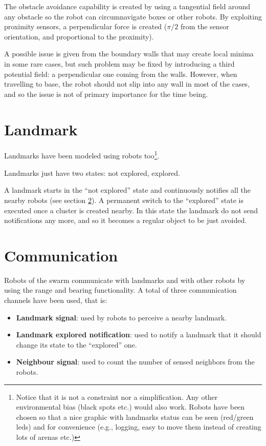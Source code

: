 \smallskip
The obstacle avoidance capability is created by using a tangential field around any obstacle so the robot can circumnavigate boxes or other robots. By exploiting proximity sensors, a perpendicular force is created ($\pi/2$ from the sensor orientation, and proportional to the proximity). 

\noindent
A possible issue is given from the boundary walls that may create local minima in some rare cases, but such problem may be fixed by introducing a third potential field: a perpendicular one coming from the walls. However, when travelling to base, the robot should not slip into any wall in most of the cases, and so the issue is not of primary importance for the time being.
 
\section{Landmark}

Landmarks have been modeled using robots too\footnote{Notice that it is not a constraint nor a simplification. Any other environmental bias (black spots etc.) would also work. Robots have been chosen so that a nice graphic with landmarks status can be seen (red/green leds) and for convenience (e.g., logging, easy to move them instead of creating lots of arenas etc.)}.

\noindent
Landmarks just have two states: not explored, explored. 

\noindent
A landmark starts in the ``not explored'' state and continuously notifies all the nearby robots (see section \ref{sec:communication}).
A permanent switch to the ``explored'' state is executed once a cluster is created nearby. In this state the landmark do not send notifications any more, and so it becomes a regular object to be just avoided.


\section{Communication}\label{sec:communication}

\smallskip
Robots of the swarm communicate with landmarks and with other robots by using the range and bearing functionality. A total of three communication channels have been used, that is:

\begin{itemize}

  \item [1] \textbf{Landmark signal}: used by robots to perceive a nearby landmark.
  \item [2] \textbf{Landmark explored notification}: used to notify a landmark that it should change its state to the ``explored'' one.
  \item [3] \textbf{Neighbour signal}: used to count the number of sensed neighbors from the robots. 
 
\end{itemize}

